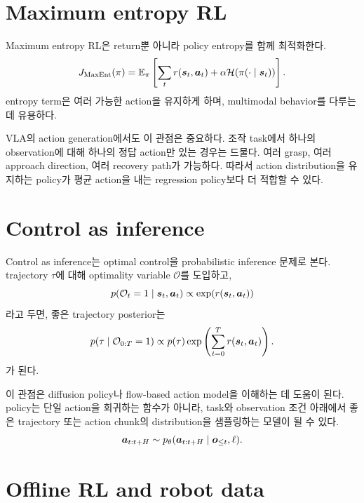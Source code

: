 \section{Maximum entropy RL}

Maximum entropy RL은 return뿐 아니라 policy entropy를 함께 최적화한다.
\begin{equation}
  J_{\mathrm{MaxEnt}}(\pi)
  =
  \mathbb{E}_{\pi}
  \left[
  \sum_{t}
  r(\bm{s}_t,\bm{a}_t)
  +
  \alpha \mathcal{H}(\pi(\cdot\mid \bm{s}_t))
  \right].
  \label{eq:maxent-rl}
\end{equation}
entropy term은 여러 가능한 action을 유지하게 하며, multimodal behavior를 다루는 데 유용하다.

VLA의 action generation에서도 이 관점은 중요하다. 조작 task에서 하나의 observation에 대해 하나의 정답 action만 있는 경우는 드물다. 여러 grasp, 여러 approach direction, 여러 recovery path가 가능하다. 따라서 action distribution을 유지하는 policy가 평균 action을 내는 regression policy보다 더 적합할 수 있다.

\section{Control as inference}

Control as inference는 optimal control을 probabilistic inference 문제로 본다. trajectory $\tau$에 대해 optimality variable $\mathcal{O}$를 도입하고,
\begin{equation}
  p(\mathcal{O}_t=1\mid \bm{s}_t,\bm{a}_t)
  \propto
  \exp(r(\bm{s}_t,\bm{a}_t))
  \label{eq:optimality-likelihood}
\end{equation}
라고 두면, 좋은 trajectory posterior는
\begin{equation}
  p(\tau\mid \mathcal{O}_{0:T}=1)
  \propto
  p(\tau)
  \exp\left(\sum_{t=0}^{T}r(\bm{s}_t,\bm{a}_t)\right).
  \label{eq:trajectory-posterior}
\end{equation}
가 된다.

이 관점은 diffusion policy나 flow-based action model을 이해하는 데 도움이 된다. policy는 단일 action을 회귀하는 함수가 아니라, task와 observation 조건 아래에서 좋은 trajectory 또는 action chunk의 distribution을 샘플링하는 모델이 될 수 있다.
\begin{equation}
  \bm{a}_{t:t+H}
  \sim
  p_{\theta}(\bm{a}_{t:t+H}\mid \bm{o}_{\le t},\ell).
  \label{eq:action-chunk-distribution}
\end{equation}

\section{Offline RL and robot data}

